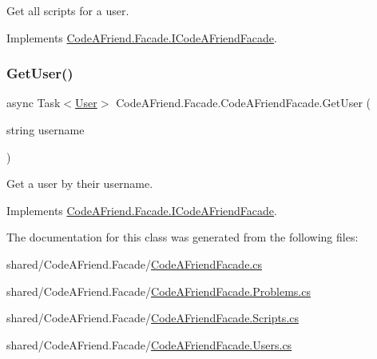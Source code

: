 Get all scripts for a user. 



Implements \mbox{\hyperlink{interface_code_a_friend_1_1_facade_1_1_i_code_a_friend_facade_acc0a8e1606ff89320a2cdbcb69f9d338}{Code\+A\+Friend.\+Facade.\+I\+Code\+A\+Friend\+Facade}}.

\mbox{\label{class_code_a_friend_1_1_facade_1_1_code_a_friend_facade_a5cc08aa0377f29fd3f80e1d880059951}} 
\subsubsection{\texorpdfstring{Get\+User()}{GetUser()}}
{\footnotesize\ttfamily async Task$<$\mbox{\hyperlink{class_code_a_friend_1_1_data_model_1_1_user}{User}}$>$ Code\+A\+Friend.\+Facade.\+Code\+A\+Friend\+Facade.\+Get\+User (\begin{DoxyParamCaption}\item[{string}]{username }\end{DoxyParamCaption})}



Get a user by their username. 



Implements \mbox{\hyperlink{interface_code_a_friend_1_1_facade_1_1_i_code_a_friend_facade_a2f9f5a0cf07b54b171af4770e519c30b}{Code\+A\+Friend.\+Facade.\+I\+Code\+A\+Friend\+Facade}}.



The documentation for this class was generated from the following files\+:\begin{DoxyCompactItemize}
\item 
shared/\+Code\+A\+Friend.\+Facade/\mbox{\hyperlink{_code_a_friend_facade_8cs}{Code\+A\+Friend\+Facade.\+cs}}\item 
shared/\+Code\+A\+Friend.\+Facade/\mbox{\hyperlink{_code_a_friend_facade_8_problems_8cs}{Code\+A\+Friend\+Facade.\+Problems.\+cs}}\item 
shared/\+Code\+A\+Friend.\+Facade/\mbox{\hyperlink{_code_a_friend_facade_8_scripts_8cs}{Code\+A\+Friend\+Facade.\+Scripts.\+cs}}\item 
shared/\+Code\+A\+Friend.\+Facade/\mbox{\hyperlink{_code_a_friend_facade_8_users_8cs}{Code\+A\+Friend\+Facade.\+Users.\+cs}}\end{DoxyCompactItemize}
